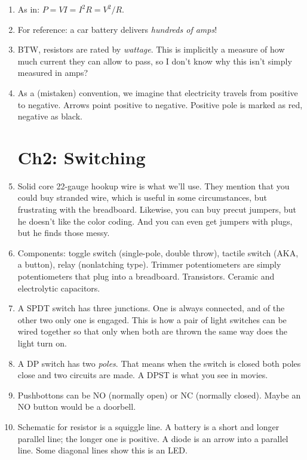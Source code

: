 \documentclass[11pt, oneside]{amsart}
\begin{document}
\begin{enumerate}
  \item As in: $P = V I = I^2 R = V^2 / R$.

  \item For reference: a car battery delivers \emph{hundreds of amps}!

  \item BTW, resistors are rated by \emph{wattage}. This is implicitly a
  measure of how much current they can allow to pass, so I don't know
  why this isn't simply measured in amps?

  \item As a (mistaken) convention, we imagine that electricity travels
  from positive to negative. Arrows point positive to negative. Positive
  pole is marked as red, negative as black.

  \section{Ch2: Switching}

  \item Solid core 22-gauge hookup wire is what we'll use. They mention
  that you could buy stranded wire, which is useful in some
  circumstances, but frustrating with the breadboard. Likewise, you can
  buy precut jumpers, but he doesn't like the color coding. And you can
  even get jumpers with plugs, but he finds those messy.

  \item Components: toggle switch (single-pole, double throw), tactile
  switch (AKA, a button), relay (nonlatching type). Trimmer
  potentiometers are simply potentiometers that plug into a breadboard.
  Transistors. Ceramic and electrolytic capacitors.

  \item A SPDT switch has three junctions. One is always connected, and
  of the other two only one is engaged. This is how a pair of light
  switches can be wired together so that only when both are thrown the
  same way does the light turn on.

  \item A DP switch has two \emph{poles}. That means when the switch is
  closed both poles close and two circuits are made. A DPST is what you
  see in movies.

  \item Pushbottons can be NO (normally open) or NC (normally closed).
  Maybe an NO button would be a doorbell.

  \item Schematic for resistor is a squiggle line. A battery is a short
  and longer parallel line; the longer one is positive. A diode is an
  arrow into a parallel line. Some diagonal lines show this is an LED.


\end{enumerate}
\end{document}
